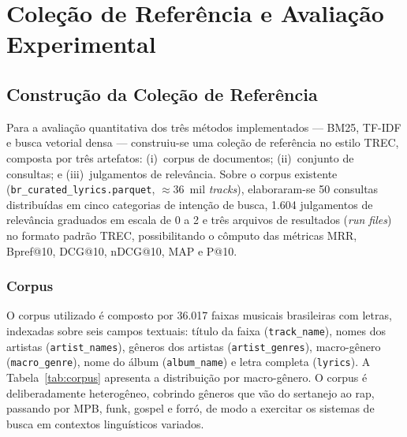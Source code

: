 \documentclass[12pt]{article}
\begin{document}
\section{Coleção de Referência e Avaliação Experimental}
\label{sec:colecao}

\subsection{Construção da Coleção de Referência}

Para a avaliação quantitativa dos três métodos implementados --- BM25, TF-IDF e
busca vetorial densa --- construiu-se uma coleção de referência no estilo TREC,
composta por três artefatos: (i)~corpus de documentos; (ii)~conjunto de
consultas; e (iii)~julgamentos de relevância. Sobre o corpus existente
(\texttt{br\_curated\_lyrics.parquet}, $\approx$36~mil \textit{tracks}),
elaboraram-se 50 consultas distribuídas em cinco categorias de intenção de
busca, 1.604 julgamentos de relevância graduados em escala de 0 a 2 e três
arquivos de resultados (\textit{run files}) no formato padrão TREC,
possibilitando o cômputo das métricas MRR, Bpref@10, DCG@10, nDCG@10, MAP e
P@10.

\subsubsection{Corpus}

O corpus utilizado é composto por 36.017 faixas musicais brasileiras com letras,
indexadas sobre seis campos textuais: título da faixa (\texttt{track\_name}),
nomes dos artistas (\texttt{artist\_names}), gêneros dos artistas
(\texttt{artist\_genres}), macro-gênero (\texttt{macro\_genre}), nome do álbum
(\texttt{album\_name}) e letra completa (\texttt{lyrics}). A
Tabela~\ref{tab:corpus} apresenta a distribuição por macro-gênero. O corpus é
deliberadamente heterogêneo, cobrindo gêneros que vão do sertanejo ao rap,
passando por MPB, funk, gospel e forró, de modo a exercitar os sistemas de busca
em contextos linguísticos variados.
\end{document}
